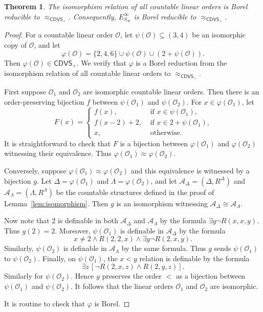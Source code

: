 \documentclass{amsart}
\newtheorem{theorem}{Theorem}[section]
\theoremstyle{definition}
\theoremstyle{remark}
\begin{document}
\begin{theorem}\label{thm:CDVS+} The isomorphism relation of all countable linear orders is Borel reducible to $\approx_{\mathsf{CDVS}_+}$. Consequently, $E^\infty_{S_\infty}$ is Borel reducible to $\approx_{\mathsf{CDVS}_+}$.
\end{theorem}

\begin{proof}
For a countable linear order $\mathcal{O}$, let $\psi(\mathcal{O})\subseteq (3,4)$  be an isomorphic copy of $\mathcal{O}$, and let 
$$\varphi(\mathcal{O})=\{2,4,6\}\cup\psi(\mathcal{O})\cup(2+\psi(\mathcal{O})). $$
Then $\varphi(\mathcal{O})\in \mathsf{CDVS}_+$. We verify that $\varphi$ is a Borel reduction from the isomorphism relation of all countable linear orders to $\approx_{\mathsf{CDVS}_+}$.

First suppose $\mathcal{O}_1$ and $\mathcal{O}_2$ are isomorphic countable linear orders. Then there is an order-preserving bijection $f$ between $\psi(\mathcal{O}_1)$ and $\psi(\mathcal{O}_2)$. For $x\in\varphi(\mathcal{O}_1)$, let 
$$F(x)=\left\{\begin{array}{ll} f(x),  & \mbox{ if $x\in\psi(\mathcal{O}_1)$,} \\
f(x-2)+2, & \mbox{ if $x\in 2+\psi(\mathcal{O}_1)$,} \\
x, & \mbox{ otherwise.}
\end{array}\right.
$$
It is straightforward to check that $F$ is a bijection between $\varphi(\mathcal{O}_1)$ and $\varphi(\mathcal{O}_2)$ witnessing their equivalence. Thus $\varphi(\mathcal{O}_1)\approx \varphi(\mathcal{O}_2)$.

Conversely, suppose $\varphi(\mathcal{O}_1)\approx \varphi(\mathcal{O}_2)$ and this equivalence is witnessed by a bijection $g$. Let $\Delta=\varphi(\mathcal{O}_1)$ and $\Lambda=\varphi(\mathcal{O}_2)$, and let $\mathcal{A}_\Delta=(\Delta, R^\Delta)$ and $\mathcal{A}_\Lambda=(\Lambda, R^\Lambda)$ be the countable structures defined in the proof of Lemma~\ref{lem:isomorphism}.  Then $g$ is an isomorphism witnessing $\mathcal{A}_\Delta\cong \mathcal{A}_\Lambda$. 

Now note that $2$ is definable in both $\mathcal{A}_\Delta$ and $\mathcal{A}_\Lambda$ by the formula $\exists y\neg R(x, x, y)$. Thus $g(2)=2$. 
Moreover, $\psi(\mathcal{O}_1)$ is definable in $\mathcal{A}_\Delta$ by the formula 
$$ x\neq 2\wedge R(2, 2, x) \wedge \exists y\neg R(2,x,y). $$
Similarly, $\psi(\mathcal{O}_2)$ is definable in $\mathcal{A}_\Lambda$ by the same formula. Thus $g$ sends $\psi(\mathcal{O}_1)$ to $\psi(\mathcal{O}_2)$. Finally, on $\psi(\mathcal{O}_1)$, the $x<y$ relation is definable by the formula
$$ \exists z\, [\neg R(2, x, z) \wedge R(2,y,z)]. $$
Similarly for $\psi(\mathcal{O}_2)$. Hence $g$ preserves the order $<$ as a bijection between $\psi(\mathcal{O}_1)$ and $\psi(\mathcal{O}_2)$. It follows that the linear orders $\mathcal{O}_1$ and $\mathcal{O}_2$ are isomorphic.

It is routine to check that $\varphi$ is Borel.
\end{proof}
\end{document}
